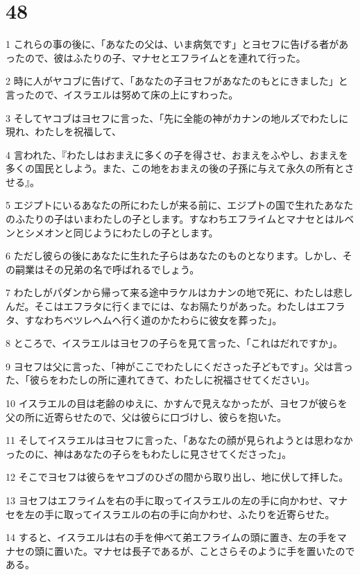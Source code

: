 \chapter{48}

\par 1 これらの事の後に、「あなたの父は、いま病気です」とヨセフに告げる者があったので、彼はふたりの子、マナセとエフライムとを連れて行った。
\par 2 時に人がヤコブに告げて、「あなたの子ヨセフがあなたのもとにきました」と言ったので、イスラエルは努めて床の上にすわった。
\par 3 そしてヤコブはヨセフに言った、「先に全能の神がカナンの地ルズでわたしに現れ、わたしを祝福して、
\par 4 言われた、『わたしはおまえに多くの子を得させ、おまえをふやし、おまえを多くの国民としよう。また、この地をおまえの後の子孫に与えて永久の所有とさせる』。
\par 5 エジプトにいるあなたの所にわたしが来る前に、エジプトの国で生れたあなたのふたりの子はいまわたしの子とします。すなわちエフライムとマナセとはルベンとシメオンと同じようにわたしの子とします。
\par 6 ただし彼らの後にあなたに生れた子らはあなたのものとなります。しかし、その嗣業はその兄弟の名で呼ばれるでしょう。
\par 7 わたしがパダンから帰って来る途中ラケルはカナンの地で死に、わたしは悲しんだ。そこはエフラタに行くまでには、なお隔たりがあった。わたしはエフラタ、すなわちベツレヘムへ行く道のかたわらに彼女を葬った」。
\par 8 ところで、イスラエルはヨセフの子らを見て言った、「これはだれですか」。
\par 9 ヨセフは父に言った、「神がここでわたしにくださった子どもです」。父は言った、「彼らをわたしの所に連れてきて、わたしに祝福させてください」。
\par 10 イスラエルの目は老齢のゆえに、かすんで見えなかったが、ヨセフが彼らを父の所に近寄らせたので、父は彼らに口づけし、彼らを抱いた。
\par 11 そしてイスラエルはヨセフに言った、「あなたの顔が見られようとは思わなかったのに、神はあなたの子らをもわたしに見させてくださった」。
\par 12 そこでヨセフは彼らをヤコブのひざの間から取り出し、地に伏して拝した。
\par 13 ヨセフはエフライムを右の手に取ってイスラエルの左の手に向かわせ、マナセを左の手に取ってイスラエルの右の手に向かわせ、ふたりを近寄らせた。
\par 14 すると、イスラエルは右の手を伸べて弟エフライムの頭に置き、左の手をマナセの頭に置いた。マナセは長子であるが、ことさらそのように手を置いたのである。
